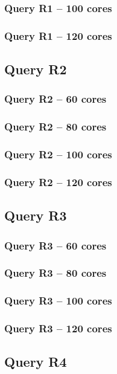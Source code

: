 \documentclass[a4paper,11pt]{article}
\begin{document}
\subsubsection{Query R1 -- 100 cores}
\newpage
\subsubsection{Query R1 -- 120 cores}
\newpage
\subsection{Query R2}
\subsubsection{Query R2 -- 60 cores}
\newpage
\subsubsection{Query R2 -- 80 cores}
\newpage
\subsubsection{Query R2 -- 100 cores}
\newpage
\subsubsection{Query R2 -- 120 cores}
\newpage
\subsection{Query R3}
\subsubsection{Query R3 -- 60 cores}
\newpage
\subsubsection{Query R3 -- 80 cores}
\newpage
\subsubsection{Query R3 -- 100 cores}
\newpage
\subsubsection{Query R3 -- 120 cores}
\newpage
\subsection{Query R4}
\end{document}
